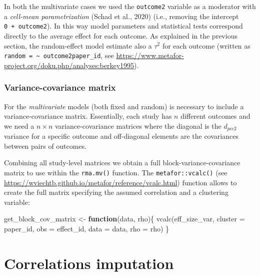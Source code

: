 \documentclass[
]{article}
\newenvironment{Shaded}{\begin{snugshade}}{\end{snugshade}}
\newcommand{\AttributeTok}[1]{\textcolor[rgb]{0.77,0.63,0.00}{#1}}
\newcommand{\ControlFlowTok}[1]{\textcolor[rgb]{0.13,0.29,0.53}{\textbf{#1}}}
\newcommand{\FunctionTok}[1]{\textcolor[rgb]{0.00,0.00,0.00}{#1}}
\newcommand{\NormalTok}[1]{#1}
\newcommand{\OtherTok}[1]{\textcolor[rgb]{0.56,0.35,0.01}{#1}}
\begin{document}
In both the multivariate cases we used the \texttt{outcome2} variable as a moderator with a \emph{cell-mean parametrization} (Schad et al., 2020) (i.e., removing the intercept \texttt{0\ +\ outcome2}). In this way model parameters and statistical tests correspond directly to the average effect for each outcome. As explained in the previous section, the random-effect model estimate also a \(\tau^2\) for each outcome (written as \texttt{random\ =\ \textasciitilde{}\ outcome2\textbar{}paper\_id}, see \url{https://www.metafor-project.org/doku.php/analyses:berkey1995}).

\hypertarget{variance-covariance-matrix}{%
\subsubsection{Variance-covariance matrix}\label{variance-covariance-matrix}}

For the \emph{multivariate} models (both fixed and random) is necessary to include a variance-covariance matrix. Essentially, each study has \(n\) different outcomes and we need a \(n \times n\) variance-covariance matrices where the diagonal is the \(d_{pcc2}\) variance for a specific outcome and off-diagonal elements are the covariances between pairs of outcomes.

Combining all study-level matrices we obtain a full block-variance-covariance matrix to use within the \texttt{rma.mv()} function. The \texttt{metafor::vcalc()} (see \url{https://wviechtb.github.io/metafor/reference/vcalc.html}) function allows to create the full matrix specifying the assumed correlation and a clustering variable:

\begin{Shaded}
\begin{Highlighting}[]
\NormalTok{get\_block\_cov\_matrix }\OtherTok{\textless{}{-}} \ControlFlowTok{function}\NormalTok{(data, rho)\{}
    \FunctionTok{vcalc}\NormalTok{(eff\_size\_var, }\AttributeTok{cluster =}\NormalTok{ paper\_id, }\AttributeTok{obs =}\NormalTok{ effect\_id, }\AttributeTok{data =}\NormalTok{ data, }\AttributeTok{rho =}\NormalTok{ rho)}
\NormalTok{\}}
\end{Highlighting}
\end{Shaded}

\hypertarget{correlations}{%
\section{Correlations imputation}\label{correlations}}
\end{document}

